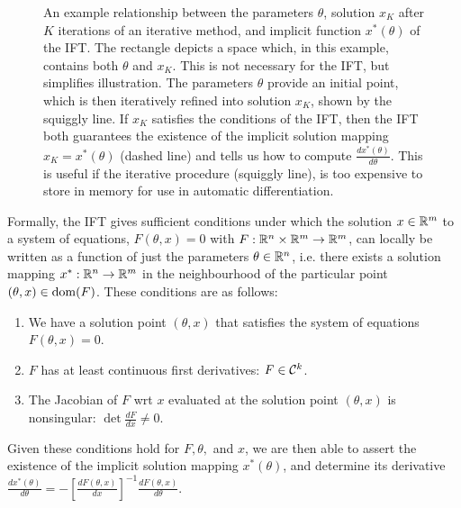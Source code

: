\documentclass[11pt]{article}
\begin{document}
\begin{figure}
\centering
{}
\caption{
\label{fig:optift}
An example relationship between the parameters $\theta$,
solution $x_{K}$ after $K$ iterations of an iterative method,
and implicit function $x^*(\theta)$ of the IFT.
The rectangle depicts a space which, in this example,
contains both $\theta$ and $x_K$.
This is not necessary for the IFT, but simplifies illustration.
The parameters $\theta$ provide an initial point, which is then iteratively refined
into solution $x_{K}$, shown by the squiggly line.
If $x_{K}$ satisfies the conditions of the IFT, then the IFT both
guarantees the existence of the implicit solution mapping $x_K = x^*(\theta)$
(dashed line)
and tells us how to compute $\frac{dx^*(\theta)}{d\theta}$.
This is useful if the iterative procedure (squiggly line), is too expensive
to store in memory for use in automatic differentiation.
}
\end{figure}

Formally, the IFT gives sufficient conditions under which the solution $x\in\mathbb{R}^m$
to a system of equations, $F(\theta, x) = 0$ with $F: \mathbb{R}^n\times\mathbb{R}^m\to\mathbb{R}^m$,
can locally be written as a function of just the parameters $\theta\in\mathbb{R}^n$,
i.e. there exists a solution mapping $x^*:\mathbb{R}^n\to\mathbb{R}^m$
in the neighbourhood of the particular point $(\theta,x)\in\mathrm{dom }(F)$.
These conditions are as follows:
\begin{enumerate}
\item We have a solution point $(\theta, x)$ that satisfies the system of equations
    $F(\theta, x) = 0$.
\item $F$ has at least continuous first derivatives: $F \in \mathcal{C}^k$.
\item The Jacobian of $F$ wrt $x$ evaluated at the solution point $(\theta,x)$ is nonsingular:
    $\det \frac{d F}{d x} \neq 0$.
\end{enumerate}
Given these conditions hold for $F,\theta,$ and $x$, we are then
able to assert the existence of the implicit solution mapping $x^*(\theta)$,
and determine its derivative
$\frac{d x^*(\theta)}{d\theta} = -[\frac{dF(\theta,x)}{dx}]^{-1}
    \frac{d F(\theta,x)}{d\theta}$.
\end{document}
